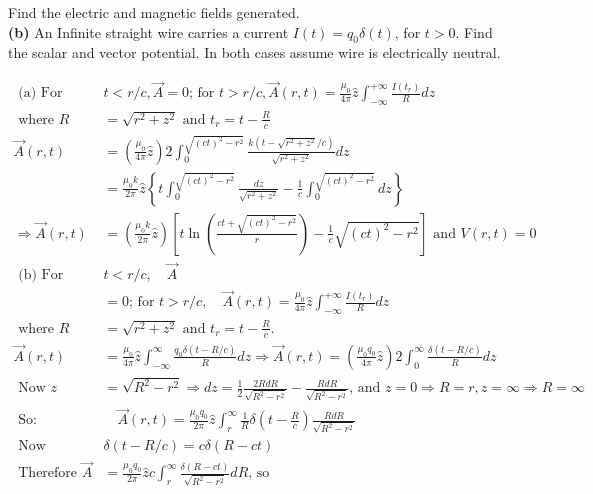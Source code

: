 \begin{enumerate}
	Find the electric and magnetic fields generated.\\
	\textbf{(b)} An Infinite straight wire carries a current $I(t)=q_{0} \delta(t)$, for $t>0$.
	Find the scalar and vector potential. In both cases assume wire is electrically neutral.
	\begin{answer}
		\begin{align*}
		\text { (a) For }& t<r / c, \vec{A}=0 \text {; for } t>r / c, \vec{A}(r, t)=\frac{\mu_{0}}{4 \pi} \hat{z} \int_{-\infty}^{+\infty} \frac{I\left(t_{r}\right)}{R} d z\\
		\text { where } R&=\sqrt{r^{2}+z^{2}} \text { and } t_{r}=t-\frac{R}{c}\\
		\vec{A}(r, t)&=\left(\frac{\mu_{0}}{4 \pi} \hat{z}\right) 2 \int_{0}^{\sqrt{(c t)^{2}-r^{2}}} \frac{k\left(t-\sqrt{r^{2}+z^{2}} / c\right)}{\sqrt{r^{2}+z^{2}}} d z\\&=\frac{\mu_{0} k}{2 \pi} \hat{z}\left\{t \int_{0}^{\sqrt{(c t)^{2}-r^{2}}} \frac{d z}{\sqrt{r^{2}+z^{2}}}-\frac{1}{c} \int_{0}^{\sqrt{(c t)^{2}-r^{2}}} d z\right\}\\
		\Rightarrow \vec{A}(r, t)&=\left(\frac{\mu_{0} k}{2 \pi} \hat{z}\right)\left[t \ln \left(\frac{c t+\sqrt{(c t)^{2}-r^{2}}}{r}\right)-\frac{1}{c} \sqrt{(c t)^{2}-r^{2}}\right] \text { and } V(r, t)=0\\
		\text { (b) For } &t<r / c, \quad \vec{A}\\&=0 \text {; for } t>r / c, \quad \vec{A}(r, t)=\frac{\mu_{0}}{4 \pi} \hat{z} \int_{-\infty}^{+\infty} \frac{I\left(t_{r}\right)}{R} d z\\
		\text { where } R&=\sqrt{r^{2}+z^{2}} \text { and } t_{r}=t-\frac{R}{c} \text {. }\\
		\vec{A}(r, t)&=\frac{\mu_{0}}{4 \pi} \hat{z} \int_{-\infty}^{\infty} \frac{q_{0} \delta(t-R / c)}{R} d z \Rightarrow \vec{A}(r, t)=\left(\frac{\mu_{0} q_{0}}{4 \pi} \hat{z}\right) 2 \int_{0}^{\infty} \frac{\delta(t-R / c)}{R} d z\\
		\text { Now } z&=\sqrt{R^{2}-r^{2}} \Rightarrow d z=\frac{1}{2} \frac{2 R d R}{\sqrt{R^{2}-r^{2}}}-\frac{R d R}{\sqrt{R^{2}-r^{2}}} \text {, and } z=0 \Rightarrow R=r, z=\infty \Rightarrow R=\infty\\
		\text { So: } &\quad \vec{A}(r, t)=\frac{\mu_{0} q_{0}}{2 \pi} \hat{z} \int_{r}^{\infty} \frac{1}{R} \delta\left(t-\frac{R}{c}\right) \frac{R d R}{\sqrt{R^{2}-r^{2}}}\\
		\text { Now }& \delta(t-R / c)=c \delta(R-c t)\\
		\text { Therefore } \vec{A}&=\frac{\mu_{0} q_{0}}{2 \pi} \hat{z} c \int_{r}^{\infty} \frac{\delta(R-c t)}{\sqrt{R^{2}-r^{2}}} d R \text {, so }\\

\end{align*}
\end{answer}
\end{enumerate}
